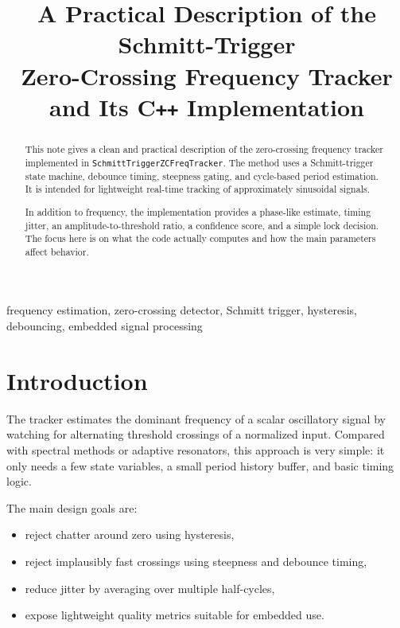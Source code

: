 \documentclass[conference]{IEEEtran}
\title{A Practical Description of the Schmitt-Trigger\\
Zero-Crossing Frequency Tracker and Its C\texttt{++} Implementation}
\author{%
  \IEEEauthorblockN{Mikhail S.\ Grushinskiy}
  \IEEEauthorblockA{Independent Researcher\\
  Bareboat Necessities Project\\
  \texttt{mgrouch@users.github.com}}
}
\begin{document}
\maketitle

\begin{abstract}
This note gives a clean and practical description of the zero-crossing
frequency tracker implemented in \texttt{SchmittTriggerZCFreqTracker}. The
method uses a Schmitt-trigger state machine, debounce timing, steepness
gating, and cycle-based period estimation. It is intended for lightweight
real-time tracking of approximately sinusoidal signals.

In addition to frequency, the implementation provides a phase-like estimate,
timing jitter, an amplitude-to-threshold ratio, a confidence score, and a
simple lock decision. The focus here is on what the code actually computes
and how the main parameters affect behavior.
\end{abstract}

\begin{IEEEkeywords}
frequency estimation, zero-crossing detector, Schmitt trigger, hysteresis,
debouncing, embedded signal processing
\end{IEEEkeywords}

\section{Introduction}

The tracker estimates the dominant frequency of a scalar oscillatory signal by
watching for alternating threshold crossings of a normalized input. Compared
with spectral methods or adaptive resonators, this approach is very simple:
it only needs a few state variables, a small period history buffer, and basic
timing logic.

The main design goals are:
\begin{itemize}[leftmargin=1.4em]
  \item reject chatter around zero using hysteresis,
  \item reject implausibly fast crossings using steepness and debounce timing,
  \item reduce jitter by averaging over multiple half-cycles,
  \item expose lightweight quality metrics suitable for embedded use.
\end{itemize}

\end{document}
